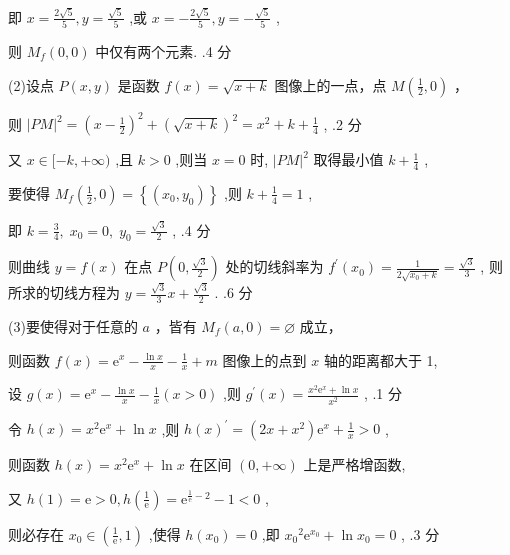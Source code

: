 \documentclass[10pt]{article}
\begin{document}
即 \(x = \frac{2\sqrt{5}}{5},y = \frac{\sqrt{5}}{5}\) ,或 \(x =  - \frac{2\sqrt{5}}{5},y =  - \frac{\sqrt{5}}{5}\) ,

则 \({M}_{f}\left( {0,0}\right)\) 中仅有两个元素. .4 分

(2)设点 \(P\left( {x,y}\right)\) 是函数 \(f\left( x\right)  = \sqrt{x + k}\) 图像上的一点，点 \(M\left( {\frac{1}{2},0}\right)\) ，

则 \({\left| PM\right| }^{2} = {\left( x - \frac{1}{2}\right) }^{2} + {\left( \sqrt{x + k}\right) }^{2} = {x}^{2} + k + \frac{1}{4}\) , .2 分

又 \(x \in  \lbrack  - k, + \infty )\) ,且 \(k > 0\) ,则当 \(x = 0\) 时, \({\left| PM\right| }^{2}\) 取得最小值 \(k + \frac{1}{4}\) ,

要使得 \({M}_{f}\left( {\frac{1}{2},0}\right)  = \left\{  \left( {{x}_{0},{y}_{0}}\right) \right\}\) ,则 \(k + \frac{1}{4} = 1\) ,

即 \(k = \frac{3}{4},\;{x}_{0} = 0,\;{y}_{0} = \frac{\sqrt{3}}{2}\) , .4 分

则曲线 \(y = f\left( x\right)\) 在点 \(P\left( {0,\frac{\sqrt{3}}{2}}\right)\) 处的切线斜率为 \({f}^{\prime }\left( {x}_{0}\right)  = \frac{1}{2\sqrt{{x}_{0} + k}} = \frac{\sqrt{3}}{3}\) , 则所求的切线方程为 \(y = \frac{\sqrt{3}}{3}x + \frac{\sqrt{3}}{2}\) . .6 分

(3)要使得对于任意的 \(a\) ，皆有 \({M}_{f}\left( {a,0}\right)  = \varnothing\) 成立，

则函数 \(f\left( x\right)  = {\mathrm{e}}^{x} - \frac{\ln x}{x} - \frac{1}{x} + m\) 图像上的点到 \(x\) 轴的距离都大于 1,

设 \(g\left( x\right)  = {\mathrm{e}}^{x} - \frac{\ln x}{x} - \frac{1}{x}\left( {x > 0}\right)\) ,则 \({g}^{\prime }\left( x\right)  = \frac{{x}^{2}{\mathrm{e}}^{x} + \ln x}{{x}^{2}}\) , .1 分

令 \(h\left( x\right)  = {x}^{2}{\mathrm{e}}^{x} + \ln x\) ,则 \(h{\left( x\right) }^{\prime } = \left( {{2x} + {x}^{2}}\right) {\mathrm{e}}^{x} + \frac{1}{x} > 0\) ,

则函数 \(h\left( x\right)  = {x}^{2}{\mathrm{e}}^{x} + \ln x\) 在区间 \(\left( {0, + \infty }\right)\) 上是严格增函数,

又 \(h\left( 1\right)  = \mathrm{e} > 0,h\left( \frac{1}{\mathrm{e}}\right)  = {\mathrm{e}}^{\frac{1}{\mathrm{e}} - 2} - 1 < 0\) ,

则必存在 \({x}_{0} \in  \left( {\frac{1}{\mathrm{e}},1}\right)\) ,使得 \(h\left( {x}_{0}\right)  = 0\) ,即 \({x}_{0}{}^{2}{\mathrm{e}}^{{x}_{0}} + \ln {x}_{0} = 0\) , .3 分
\end{document}
